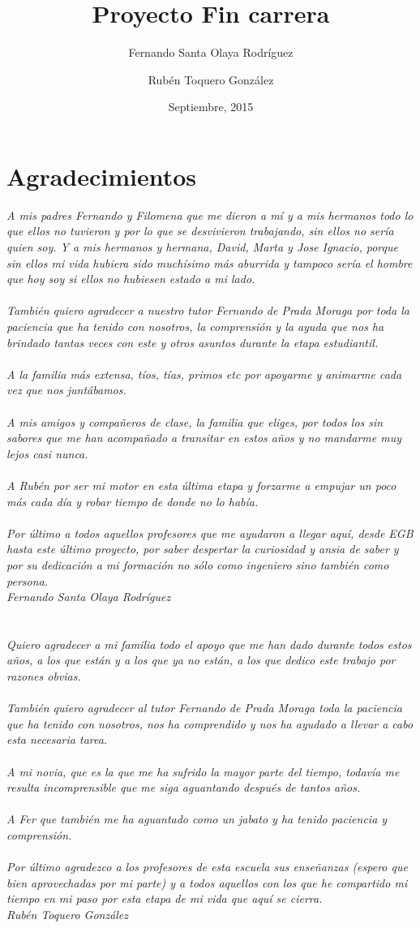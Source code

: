 \documentclass[b5paper,10pt,twoside]{book}
\title{Proyecto Fin carrera}
\author{Fernando Santa Olaya Rodríguez \\
	\and 
	Rubén Toquero González}
\date{Septiembre, 2015}
\begin{document}
	

	\chapter*{Agradecimientos}

	
	\textit{A mis padres Fernando y Filomena que me dieron a mí y a mis hermanos todo lo que ellos no tuvieron y por lo que se desvivieron trabajando, sin ellos no sería quien soy. Y a mis hermanos y hermana, David, Marta y Jose Ignacio, porque sin ellos mi vida hubiera sido muchísimo más aburrida y tampoco sería el hombre que hoy soy si ellos no hubiesen estado a mi lado.\\\\
		También quiero agradecer a nuestro tutor Fernando de Prada Moraga por toda la paciencia que ha tenido con nosotros, la comprensión y la ayuda que nos ha brindado tantas veces con este y otros asuntos durante la etapa estudiantil.\\\\
		A la familia más extensa, tíos, tías, primos etc por apoyarme y animarme cada vez que nos juntábamos.\\\\
		A mis amigos y compañeros de clase, la familia que eliges, por todos los sin sabores que me han acompañado a transitar en estos años y no mandarme muy lejos casi nunca.\\\\
		A Rubén por ser mi motor en esta última etapa y forzarme a empujar un poco más cada día y robar tiempo de donde no lo había.\\\\
		Por último a todos aquellos profesores que me ayudaron a llegar aquí, desde EGB hasta este último proyecto, por saber despertar la curiosidad y ansia de saber y por su dedicación a mi formación no sólo como ingeniero sino también como persona.\\
		Fernando Santa Olaya Rodríguez\\\\\\
		Quiero agradecer a mi familia todo el apoyo que me han dado durante todos estos años, a los que están y a los que ya no están, a los que dedico este trabajo por razones obvias.\\\\
		También quiero agradecer al tutor Fernando de Prada Moraga toda la paciencia que ha tenido con nosotros, nos ha comprendido y nos ha ayudado a llevar a cabo esta necesaria tarea.\\\\
		A mi novia, que es la que me ha sufrido la mayor parte del tiempo, todavía me resulta incomprensible que me siga aguantando después de tantos años.\\\\
		A Fer que también me ha aguantado como un jabato y ha tenido paciencia y comprensión.\\\\
		Por último agradezco a los profesores de esta escuela sus enseñanzas (espero que bien aprovechadas por mi parte) y a todos aquellos con los que he compartido mi tiempo en mi paso por esta etapa de mi vida que aquí se cierra.\\
		Rubén Toquero González} 
	
\end{document}
